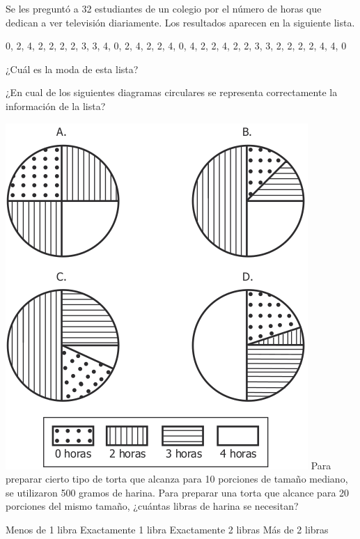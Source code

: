 \documentclass[10pt,letterpaper,addpoints]{exam}
\begin{document}
\begin{questions}
\begin{multicols}{2}
{Se les preguntó a 32 estudiantes de un colegio por el número de horas que dedican a ver televisión diariamente. Los resultados aparecen en la siguiente lista.
\begin{center}
0, 2, 4, 2, 2, 2, 2, 3, 3, 4, 0, 2, 4, 2, 2, 4, 0, 4, 2, 2, 4, 2, 2, 3, 3, 2, 2, 2, 2, 4, 4, 0
\end{center}}
  \question \label{q8} ¿Cuál es la moda de esta lista?
  
\begin{oneparchoices}
         
\end{oneparchoices}
  \question \label{q9} ¿En cual de los siguientes diagramas circulares se representa correctamente la información de la lista?
  
  \includegraphics[scale=.5]{Images/diagramas-circulares.png}
\question Para preparar cierto tipo de torta que alcanza para 10 porciones de tamaño mediano, se utilizaron 500 gramos de harina. Para preparar una torta que alcance para 20 porciones del mismo tamaño, ¿cuántas libras de harina se necesitan?

\begin{choices}
    \choice Menos de 1 libra
    \choice Exactamente 1 libra
    \CorrectChoice Exactamente 2 libras
    \choice Más de 2 libras
\end{choices}
\end{multicols}
\end{questions}
\end{document}
